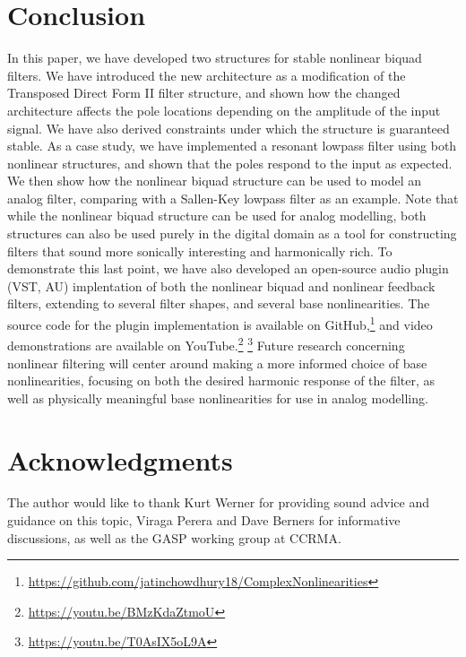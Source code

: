 \documentclass[twoside,a4paper]{article}
\begin{document}
\section{Conclusion}

In this paper, we have developed two structures for stable nonlinear biquad
filters. We have introduced the new architecture as a modification of the
Transposed Direct Form II filter structure, and shown
how the changed architecture affects the pole locations depending on
the amplitude of the input signal. We have also derived constraints under
which the structure is guaranteed stable.
\newline\newline
As a case study, we have implemented
a resonant lowpass filter using both nonlinear
structures, and shown that the
poles respond to the input as expected. We then show how the
nonlinear biquad structure can be used to model an analog
filter, comparing with a Sallen-Key lowpass filter as
an example. Note that while the nonlinear biquad structure
can be used for analog modelling, both structures can also be
used purely in the digital domain as a tool for constructing
filters that sound more sonically interesting and harmonically
rich.
\newline\newline
To demonstrate this last point, we have also developed an open-source
audio plugin (VST, AU) implentation of both the nonlinear biquad and
nonlinear feedback filters, extending to several filter shapes, and
several base nonlinearities.
The source code for the plugin implementation is available on
GitHub,\footnote{\url{https://github.com/jatinchowdhury18/ComplexNonlinearities}}
and video demonstrations are available on YouTube.\footnote{\url{https://youtu.be/BMzKdaZtmoU}}
\footnote{\url{https://youtu.be/T0AsIX5oL9A}}
\newline\newline
Future research concerning nonlinear filtering will center around making a
more informed choice of base nonlinearities, focusing on both the desired
harmonic response of the filter, as well as physically meaningful base
nonlinearities for use in analog modelling.

\section{Acknowledgments}

The author would like to thank Kurt Werner for providing sound advice and
guidance on this topic, Viraga Perera and Dave Berners for informative
discussions, as well as the GASP working group at CCRMA.

\nocite{*}


\end{document}
